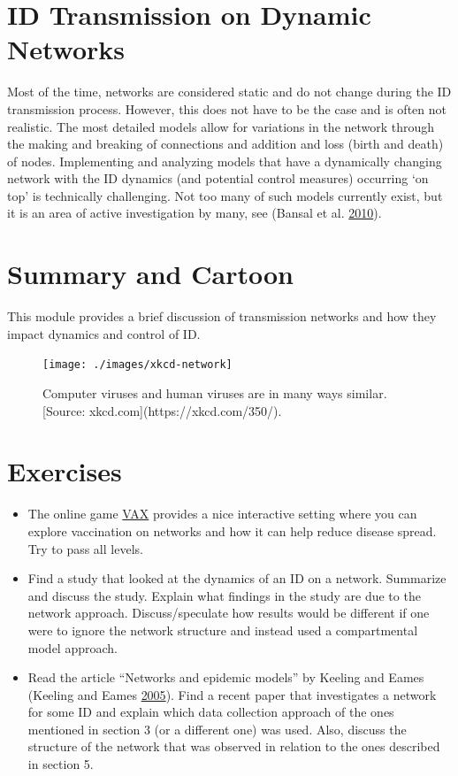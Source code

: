 \documentclass[
]{book}
\providecommand{\tightlist}{%
  \setlength{\itemsep}{0pt}\setlength{\parskip}{0pt}}
\begin{document}
\hypertarget{id-transmission-on-dynamic-networks}{%
\section{ID Transmission on Dynamic Networks}\label{id-transmission-on-dynamic-networks}}

Most of the time, networks are considered static and do not change during the ID transmission process. However, this does not have to be the case and is often not realistic. The most detailed models allow for variations in the network through the making and breaking of connections and addition and loss (birth and death) of nodes. Implementing and analyzing models that have a dynamically changing network with the ID dynamics (and potential control measures) occurring `on top' is technically challenging. Not too many of such models currently exist, but it is an area of active investigation by many, see (Bansal et al. \protect\hyperlink{ref-bansal10}{2010}).

\hypertarget{summary-and-cartoon-17}{%
\section{Summary and Cartoon}\label{summary-and-cartoon-17}}

This module provides a brief discussion of transmission networks and how they impact dynamics and control of ID.

\begin{figure}
\texttt{[image: ./images/xkcd-network]} \caption{Computer viruses and human viruses are in many ways similar. [Source: xkcd.com](https://xkcd.com/350/).}\label{fig:xkcdnetwork}
\end{figure}

\hypertarget{exercises-17}{%
\section{Exercises}\label{exercises-17}}

\begin{itemize}
\tightlist
\item
  The online game \href{http://vax.herokuapp.com/}{VAX} provides a nice interactive setting where you can explore vaccination on networks and how it can help reduce disease spread. Try to pass all levels.
\item
  Find a study that looked at the dynamics of an ID on a network. Summarize and discuss the study. Explain what findings in the study are due to the network approach. Discuss/speculate how results would be different if one were to ignore the network structure and instead used a compartmental model approach.
\item
  Read the article ``Networks and epidemic models'' by Keeling and Eames (Keeling and Eames \protect\hyperlink{ref-keeling05}{2005}). Find a recent paper that investigates a network for some ID and explain which data collection approach of the ones mentioned in section 3 (or a different one) was used. Also, discuss the structure of the network that was observed in relation to the ones described in section 5.
\end{itemize}
\end{document}
